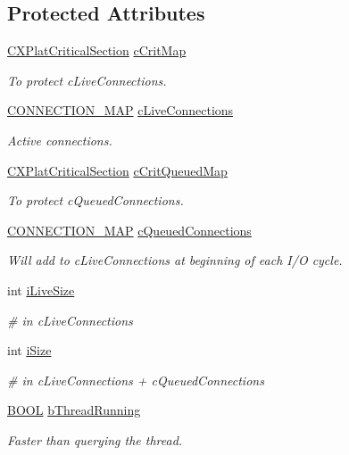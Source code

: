 \subsection*{\-Protected \-Attributes}
\begin{DoxyCompactItemize}
\item 
\hyperlink{class_c_x_plat_critical_section}{\-C\-X\-Plat\-Critical\-Section} \hyperlink{class_c_p_handler_a58ba2190209441a5fd44cd4bd1605d79}{c\-Crit\-Map}
\begin{DoxyCompactList}\small\item\em \-To protect c\-Live\-Connections. \end{DoxyCompactList}\item 
\hyperlink{_c_p_handler_8h_ae505ccb84a814fad400e0daede272812}{\-C\-O\-N\-N\-E\-C\-T\-I\-O\-N\-\_\-\-M\-A\-P} \hyperlink{class_c_p_handler_a7ca8fa5c60e6aad56b2b1a2cac68a2e2}{c\-Live\-Connections}
\begin{DoxyCompactList}\small\item\em \-Active connections. \end{DoxyCompactList}\item 
\hyperlink{class_c_x_plat_critical_section}{\-C\-X\-Plat\-Critical\-Section} \hyperlink{class_c_p_handler_a7ffaac647fdd73d143c342bbb88cd379}{c\-Crit\-Queued\-Map}
\begin{DoxyCompactList}\small\item\em \-To protect c\-Queued\-Connections. \end{DoxyCompactList}\item 
\hyperlink{_c_p_handler_8h_ae505ccb84a814fad400e0daede272812}{\-C\-O\-N\-N\-E\-C\-T\-I\-O\-N\-\_\-\-M\-A\-P} \hyperlink{class_c_p_handler_acf71b63ae0b5079e1f8e37cba56f27ea}{c\-Queued\-Connections}
\begin{DoxyCompactList}\small\item\em \-Will add to c\-Live\-Connections at beginning of each \-I/\-O cycle. \end{DoxyCompactList}\item 
int \hyperlink{class_c_p_handler_a23f12318d15c18c8d921efdc80626da4}{i\-Live\-Size}
\begin{DoxyCompactList}\small\item\em \# in c\-Live\-Connections \end{DoxyCompactList}\item 
int \hyperlink{class_c_p_handler_acc98aa0cf09e8d132f239b131a5773da}{i\-Size}
\begin{DoxyCompactList}\small\item\em \# in c\-Live\-Connections + c\-Queued\-Connections \end{DoxyCompactList}\item 
\hyperlink{_cpclient_8h_a3be13892ae7076009afcf121347dd319}{\-B\-O\-O\-L} \hyperlink{class_c_p_handler_a64ec292c01647331e6303ebf6e466d75}{b\-Thread\-Running}
\begin{DoxyCompactList}\small\item\em \-Faster than querying the thread. \end{DoxyCompactList}\end{DoxyCompactItemize}


